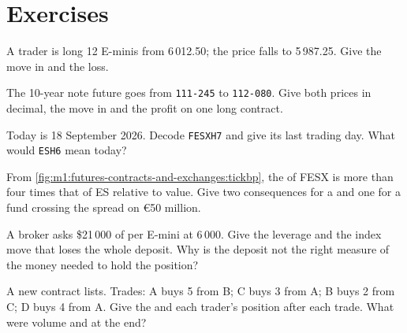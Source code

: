 \section{Exercises}

\begin{exercise}[$\star$]\label{exo:m1:futures-contracts-and-exchanges:1}
A trader is long 12 E-minis from 6\,012.50; the price falls to 5\,987.25. Give
the move in  and the loss.
\end{exercise}

\begin{exercise}[$\star$]\label{exo:m1:futures-contracts-and-exchanges:2}
The 10-year note future goes from \texttt{111-245} to \texttt{112-080}. Give
both prices in decimal, the move in  and the profit on one long
contract.
\end{exercise}

\begin{exercise}[$\star$]\label{exo:m1:futures-contracts-and-exchanges:3}
Today is 18 September 2026. Decode \texttt{FESXH7} and give its last trading
day. What would \texttt{ESH6} mean today?
\end{exercise}

\begin{exercise}[$\star\star$]\label{exo:m1:futures-contracts-and-exchanges:4}
From \cref{fig:m1:futures-contracts-and-exchanges:tickbp}, the  of FESX is
more than four times that of ES relative to value. Give two consequences
for a  and one for a fund crossing the spread on \euro50 million.
\end{exercise}

\begin{exercise}[$\star\star$]\label{exo:m1:futures-contracts-and-exchanges:5}
A broker asks \$21\,000 of  per E-mini at 6\,000. Give the
leverage and the index move that loses the whole deposit. Why is the
deposit not the right measure of the money needed to hold the position?
\end{exercise}

\begin{exercise}[$\star\star$]\label{exo:m1:futures-contracts-and-exchanges:6}
A new contract lists. Trades: A buys 5 from B; C buys 3 from A; B buys 2
from C; D buys 4 from A. Give the  and each trader's position
after each trade. What were volume and  at the end?
\end{exercise}

